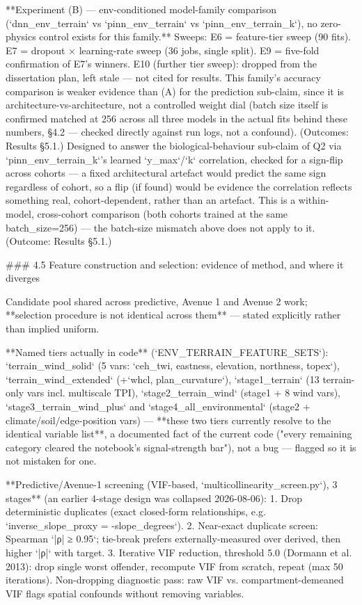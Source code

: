 **Experiment (B) — env-conditioned model-family comparison (`dnn_env_terrain` vs `pinn_env_terrain` vs `pinn_env_terrain_k`), no zero-physics control exists for this family.** Sweeps: E6 = feature-tier sweep (90 fits). E7 = dropout × learning-rate sweep (36 jobs, single split). E9 = five-fold confirmation of E7's winners. E10 (further tier sweep): dropped from the dissertation plan, left stale — not cited for results. This family's accuracy comparison is weaker evidence than (A) for the prediction sub-claim, since it is architecture-vs-architecture, not a controlled weight dial (batch size itself is confirmed matched at 256 across all three models in the actual fits behind these numbers, §4.2 — checked directly against run logs, not a confound). (Outcomes: Results §5.1.)
Designed to answer the biological-behaviour sub-claim of Q2 via `pinn_env_terrain_k`'s learned `y_max`/`k` correlation, checked for a sign-flip across cohorts — a fixed architectural artefact would predict the same sign regardless of cohort, so a flip (if found) would be evidence the correlation reflects something real, cohort-dependent, rather than an artefact. This is a within-model, cross-cohort comparison (both cohorts trained at the same batch_size=256) — the batch-size mismatch above does not apply to it. (Outcome: Results §5.1.)

### 4.5 Feature construction and selection: evidence of method, and where it diverges

Candidate pool shared across predictive, Avenue 1 and Avenue 2 work; **selection procedure is not identical across them** — stated explicitly rather than implied uniform.

**Named tiers actually in code** (`ENV_TERRAIN_FEATURE_SETS`): `terrain_wind_solid` (5 vars: `ceh_twi, eastness, elevation, northness, topex`), `terrain_wind_extended` (+`whcl, plan_curvature`), `stage1_terrain` (13 terrain-only vars incl. multiscale TPI), `stage2_terrain_wind` (stage1 + 8 wind vars), `stage3_terrain_wind_plus` and `stage4_all_environmental` (stage2 + climate/soil/edge-position vars) — **these two tiers currently resolve to the identical variable list**, a documented fact of the current code ("every remaining category cleared the notebook's signal-strength bar"), not a bug — flagged so it is not mistaken for one.

**Predictive/Avenue-1 screening (VIF-based, `multicollinearity_screen.py`), 3 stages** (an earlier 4-stage design was collapsed 2026-08-06):
1. Drop deterministic duplicates (exact closed-form relationships, e.g. `inverse_slope_proxy = -slope_degrees`).
2. Near-exact duplicate screen: Spearman `|ρ| ≥ 0.95`; tie-break prefers externally-measured over derived, then higher `|ρ|` with target.
3. Iterative VIF reduction, threshold 5.0 (Dormann et al. 2013): drop single worst offender, recompute VIF from scratch, repeat (max 50 iterations).
Non-dropping diagnostic pass: raw VIF vs. compartment-demeaned VIF flags spatial confounds without removing variables.

